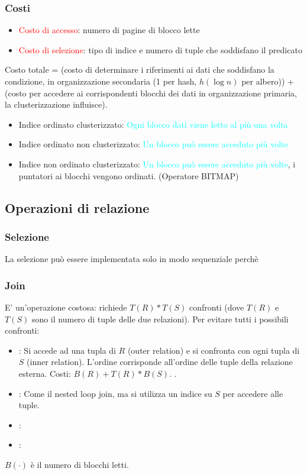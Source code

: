 \documentclass[12pt]{article}
\begin{document}
\subsubsection{Costi}
\begin{itemize}
    \item \textcolor{red}{Costo di accesso}: numero di pagine di blocco lette
    \item \textcolor{red}{Costo di selezione}: tipo di indice e numero di tuple che soddisfano il predicato
\end{itemize}
Costo totale = (costo di determinare i riferimenti ai dati che soddisfano la condizione, in organizzazione secondaria (1 per hash, $h(\log n)$ per albero)) + (costo per accedere ai
corrispondenti blocchi dei
dati in organizzazione
primaria, la clusterizzazione influisce).
\begin{itemize}
    \item Indice ordinato clusterizzato: \textcolor{Cyan}{Ogni blocco dati viene letto al più una volta}
    \item Indice ordinato non clusterizzato: \textcolor{Cyan}{Un blocco può essere acceduto più volte}
    \item Indice non ordinato clusterizzato: \textcolor{Cyan}{Un blocco può essere acceduto più volte}, i puntatori ai blocchi vengono ordinati. (Operatore BITMAP)
\end{itemize}
\subsection{Operazioni di relazione}
\subsubsection{Selezione}
La selezione può essere implementata solo in modo sequenziale perchè 
\subsubsection{Join}
E' un'operazione costosa: richiede $T(R)*T(S)$ confronti (dove $T(R)$ e $T(S)$ sono il numero di tuple delle due relazioni). Per evitare tutti i possibili confronti:
\begin{itemize}
    \item {}: Si accede ad una tupla di $R$ (outer relation) e si confronta con ogni tupla di $S$ (inner relation). L'ordine corrisponde all'ordine delle tuple della relazione esterna. Costi: $B(R) + T(R) * B(S)$. .
    \item {}: Come il nested loop join, ma si utilizza un indice su $S$ per accedere alle tuple.
    \item {}:
    \item {}:
\end{itemize}
$B(\cdot)$ è il numero di blocchi letti.
\end{document}
